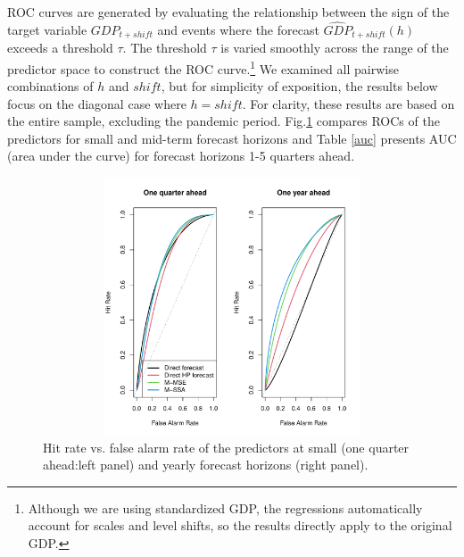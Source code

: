 \documentclass[11pt,a4paper]{article}
\begin{document}
ROC curves are generated by evaluating the relationship between the sign of the target variable $GDP_{t+shift}$  and events where the forecast $\hat{GDP}_{t+shift}(h)$ exceeds a threshold $\tau$. The threshold $\tau$ is varied smoothly across the range of the predictor space to construct the ROC curve.\footnote{Although we are using standardized GDP, the regressions automatically account for scales and level shifts, so the results directly apply to the original GDP.} We examined all pairwise combinations of $h$ and $shift$, but for simplicity of exposition, the results below focus on the diagonal case where $h=shift$. 
For clarity, these results are based on the entire sample, excluding the pandemic period. Fig.\ref{ROC_GDP_shift_1_4} compares ROCs of the predictors for small and mid-term forecast horizons and Table \ref{auc} presents AUC (area under the curve) for forecast horizons 1-5 quarters ahead.
\begin{figure}[h]\begin{center}\includegraphics[height=3in, width=5in]{./Figures/ROC_GDP_shift_1_4.pdf}\caption{Hit rate vs. false alarm rate of the predictors at small (one quarter ahead:left panel) and yearly forecast horizons (right panel).\label{ROC_GDP_shift_1_4}}\end{center}\end{figure}
\end{document}
